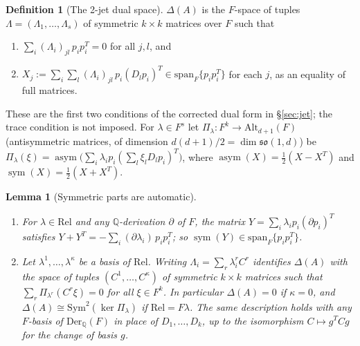 \documentclass[11pt]{amsart}
\newcommand{\Q}{\mathbb{Q}}
\theoremstyle{plain}
\newtheorem{lemma}[theorem]{Lemma}
\theoremstyle{definition}
\newtheorem{definition}[theorem]{Definition}
\begin{document}
\begin{definition}[The 2-jet dual space]\label{def:Delta}
$\Delta(A)$ is the $F$-space of tuples $\Lambda=(\Lambda_1,\dots,\Lambda_s)$ of symmetric $k\times k$
matrices over $F$ such that
\begin{enumerate}
\item[(D1)] $\sum_i(\Lambda_i)_{jl}\,p_ip_i^T=0$ for all $j,l$, and
\item[(D2)] $X_j:=\sum_i\sum_l(\Lambda_i)_{jl}\,p_i(D_lp_i)^T\in\mathrm{span}_F\{p_ip_i^T\}$ for each $j$,
as an equality of full matrices.
\end{enumerate}
These are the first two conditions of the corrected dual form in \S\ref{sec:jet}; the trace condition is not
imposed. For $\lambda\in F^s$ let $\Pi_\lambda:F^k\to\mathrm{Alt}_{d+1}(F)$ (antisymmetric matrices, of
dimension $d(d+1)/2=\dim\mathfrak{so}(1,d)$) be
$\Pi_\lambda(\xi)=\operatorname{asym}\bigl(\sum_i\lambda_ip_i(\sum_l\xi_lD_lp_i)^T\bigr)$, where
$\operatorname{asym}(X)=\tfrac12(X-X^T)$ and $\operatorname{sym}(X)=\tfrac12(X+X^T)$.
\end{definition}

\begin{lemma}[Symmetric parts are automatic]\label{lem:Pi}
\begin{enumerate}
\item[(a)] For $\lambda\in\mathrm{Rel}$ and any $\Q$-derivation $\partial$ of $F$, the matrix
$Y=\sum_i\lambda_ip_i(\partial p_i)^T$ satisfies $Y+Y^T=-\sum_i(\partial\lambda_i)\,p_ip_i^T$; so
$\operatorname{sym}(Y)\in\mathrm{span}_F\{p_ip_i^T\}$.
\item[(b)] Let $\lambda^1,\dots,\lambda^\kappa$ be a basis of $\mathrm{Rel}$. Writing
$\Lambda_i=\sum_r\lambda^r_iC^r$ identifies $\Delta(A)$ with the space of tuples $(C^1,\dots,C^\kappa)$ of
symmetric $k\times k$ matrices such that $\sum_r\Pi_{\lambda^r}(C^r\xi)=0$ for all $\xi\in F^k$. In
particular $\Delta(A)=0$ if $\kappa=0$, and $\Delta(A)\cong\mathrm{Sym}^2(\ker\Pi_\lambda)$ if
$\mathrm{Rel}=F\lambda$. The same description holds with any $F$-basis of $\mathrm{Der}_\Q(F)$ in place of
$D_1,\dots,D_k$, up to the isomorphism $C\mapsto g^TCg$ for the change of basis $g$.
\end{enumerate}
\end{lemma}
\end{document}
